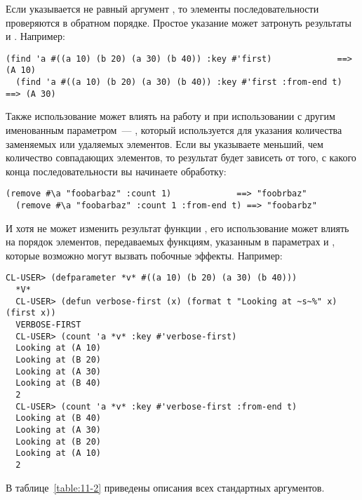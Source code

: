 Если указывается не равный  аргумент , то элементы
последовательности проверяются в обратном порядке.  Простое указание 
может затронуть результаты  и .  Например:

\begin{lstlisting}[style=lisprepl]
  (find 'a #((a 10) (b 20) (a 30) (b 40)) :key #'first)             ==> (A 10)
  (find 'a #((a 10) (b 20) (a 30) (b 40)) :key #'first :from-end t) ==> (A 30)
\end{lstlisting}

Также использование  может влиять на работу  и
 при использовании с другим именованным параметром~--- ,
который используется для указания количества заменяемых или удаляемых элементов.  Если вы
указываете  меньший, чем количество совпадающих элементов, то результат будет
зависеть от того, с какого конца последовательности вы начинаете обработку:

\begin{lstlisting}[style=lisprepl]
  (remove #\a "foobarbaz" :count 1)             ==> "foobrbaz"
  (remove #\a "foobarbaz" :count 1 :from-end t) ==> "foobarbz"
\end{lstlisting}

И хотя  не может изменить результат функции , его
использование может влиять на порядок элементов, передаваемых функциям, указанным в
параметрах  и , которые возможно могут вызвать побочные эффекты.
Например:

\begin{lstlisting}[style=lisprepl]
  CL-USER> (defparameter *v* #((a 10) (b 20) (a 30) (b 40)))
  *V*
  CL-USER> (defun verbose-first (x) (format t "Looking at ~s~%" x) (first x))
  VERBOSE-FIRST
  CL-USER> (count 'a *v* :key #'verbose-first)
  Looking at (A 10)
  Looking at (B 20)
  Looking at (A 30)
  Looking at (B 40)
  2
  CL-USER> (count 'a *v* :key #'verbose-first :from-end t)
  Looking at (B 40)
  Looking at (A 30)
  Looking at (B 20)
  Looking at (A 10)
  2
\end{lstlisting}

В таблице~\ref{table:11-2} приведены описания всех стандартных аргументов.

